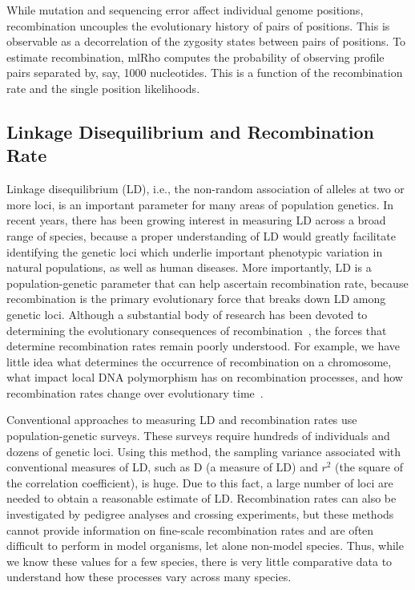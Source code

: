 \documentclass{sig-alternate}
\begin{document}
While mutation and sequencing error affect individual genome positions, recombination uncouples the
evolutionary history of pairs of positions. This is observable as a decorrelation of the zygosity states between
pairs of positions. To estimate recombination, mlRho computes the probability of observing profile pairs
separated by, say, 1000 nucleotides. This is a function of the recombination rate and the single position
likelihoods.

\subsection{Linkage Disequilibrium and Recombination Rate}\label{sec:LD}
Linkage disequilibrium (LD), i.e., the non-random association of alleles at two or more loci, is an important
parameter for many areas of population genetics.  In recent years, there has been growing interest in
measuring LD across a broad range of species, because a proper understanding of LD would greatly facilitate
identifying the genetic loci which underlie important phenotypic variation in natural populations, as well as
human diseases. More importantly, LD is a population-genetic parameter that can help ascertain recombination
rate, because recombination is the primary evolutionary force that breaks down LD among genetic loci. Although
a substantial body of research has been devoted to determining the evolutionary consequences of
recombination~\cite{resolving-paradox}, the forces that determine recombination rates remain poorly
understood. For example, we have little idea what determines the occurrence of recombination on a chromosome,
what impact local DNA polymorphism has on recombination processes, and how recombination rates change over
evolutionary time~\cite{stumpf}.

Conventional approaches to measuring LD and recombination rates use population-genetic surveys. These surveys
require hundreds of individuals and dozens of genetic loci. Using this method, the sampling variance
associated with conventional measures of LD, such as D (a measure of LD) and $r^2$ (the square of the
correlation coefficient), is huge. Due to this fact, a large number of loci are needed to obtain a reasonable
estimate of LD.  Recombination rates can also be investigated by pedigree analyses and crossing experiments,
but these methods cannot provide information on fine-scale recombination rates and are often difficult to
perform in model organisms, let alone non-model species. Thus, while we know these values for a few
species, there is very little comparative data to understand how these processes vary across many species.
\end{document}
